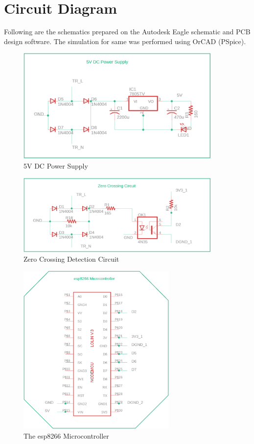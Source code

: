                \newpage
        \section{Circuit Diagram}
        
        	Following are the schematics prepared on the Autodesk Eagle schematic and PCB design software. The simulation for same was performed using OrCAD (PSpice).
        
        	\begin{figure}[H]
        		\centering
        		\includegraphics[width=0.9\textwidth]{photos/schematics/5V_DC.png}
        		\caption{5V DC Power Supply}
        	\end{figure}
	        \begin{figure}[H]
	        	\centering
	        	\includegraphics[width=0.9\textwidth]{photos/schematics/zero_cross.png}
	        	\caption{Zero Crossing Detection Circuit}
	        \end{figure}
	        \begin{figure}[H]
	        	\centering
	        	\includegraphics[width=0.7\textwidth]{photos/schematics/esp8266.png}
	        	\caption{The esp8266 Microcontroller}
	        \end{figure}
